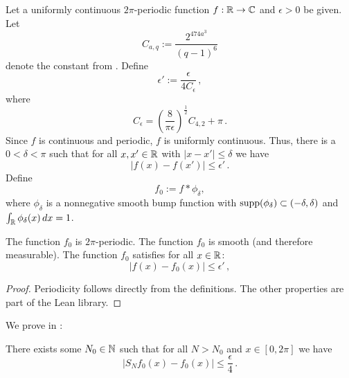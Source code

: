 Let a uniformly continuous $2\pi$-periodic function $f:{\mathbb{R}}\to \mathbb{C}$ and $\epsilon>0$ be given.
Let
\begin{equation}
    C_{a,q} := \frac{2^{474a^3}}{(q-1)^6}
\end{equation}
denote the constant from .
Define
\begin{equation}
    \epsilon' := \frac {\epsilon} {4 C_\epsilon} \,,
\end{equation}
where
\begin{equation*}
    C_\epsilon = \left(\frac{8}{\pi\epsilon}\right)^\frac{1}{2} C_{4,2} + \pi \,.
\end{equation*}
Since $f$ is continuous and periodic, $f$ is uniformly continuous.
Thus, there is a $0<\delta<\pi$
such that for all $x,x' \in {\mathbb{R}}$ with $|x-x'|\le \delta$
we have
\begin{equation}\label{uniconbound}
|f(x)-f(x')|\le \epsilon' \, .
\end{equation}
Define
\begin{equation}\label{def-fzero}
f_0:=f \ast \phi_\delta,
\end{equation}
where $\phi_\delta$ is a nonnegative smooth bump function with $\operatorname{\operatorname{supp}} (\phi_\delta) \subset (-\delta, \delta)$ and $\int _{\mathbb{R}} \phi_\delta (x) \, dx = 1$.

\begin{lemma}
\label{smooth-approximation}
\leanok
{}
    The function $f_0$ is $2\pi$-periodic.
    The function $f_0$ is smooth (and therefore measurable).
    The function $f_0$ satisfies for all $x\in {\mathbb{R}}$:
    \begin{equation}\label{eq-ffzero}
    |f(x)-f_0(x)|\le \epsilon' \, ,
    \end{equation}
\end{lemma}

\begin{proof}
    \leanok
    Periodicity follows directly from the definitions. The other properties are part of the Lean library.
\end{proof}

We prove in :
\begin{lemma}
\label{convergence-for-smooth}
\leanok
{}
    There exists some $N_0 \in {\mathbb{N}}$ such that for all $N>N_0$ and $x\in [0,2\pi]$ we have
    \begin{equation}
        |S_N f_0 (x)- f_0(x)|\le \frac \epsilon 4\, .
    \end{equation}
\end{lemma}

